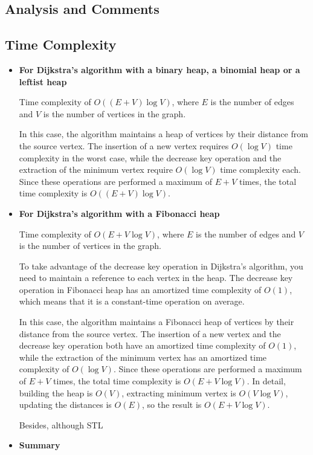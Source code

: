 \documentclass[twoside]{article}
\begin{document}
\begin{CJK*}{UTF8}{gbsn}
\section{Analysis and Comments}

\subsection{Time Complexity}
\begin{itemize}
    \item \textbf{For Dijkstra's algorithm with a binary heap, a binomial heap or a leftist heap}

    Time complexity of ${O((E + V) \log V)}$, where $E$ is the number of edges and $V$ is the number of vertices in the graph.
    
    In this case, the algorithm maintains a heap of vertices by their distance from the source vertex.  The insertion of a new vertex requires ${O(\log V)}$ time complexity in the worst case, while the decrease key operation and the extraction of the minimum vertex require ${O(\log V)}$ time complexity each.  Since these operations are performed a maximum of $E + V$ times, the total time complexity is ${O((E + V) \log V)}$.
    \item \textbf{For Dijkstra's algorithm with a Fibonacci heap}

    Time complexity of ${O(E + V \log V)}$, where $E$ is the number of edges and $V$ is the number of vertices in the graph. 

    To take advantage of the decrease key operation in Dijkstra's algorithm, you need to maintain a reference to each vertex in the heap. The decrease key operation in Fibonacci heap has an amortized time complexity of ${O(1)}$, which means that it is a constant-time operation on average.

    In this case, the algorithm maintains a Fibonacci heap of vertices by their distance from the source vertex. The insertion of a new vertex and the decrease key operation both have an amortized time complexity of ${O(1)}$, while the extraction of the minimum vertex has an amortized time complexity of ${O(\log V)}$. Since these operations are performed a maximum of $E + V$ times, the total time complexity is ${O(E + V \log V)}$. In detail, building the heap is $O(V)$, extracting minimum vertex is $O(V\log V)$, updating the distances is $O(E)$, so the result is ${O(E + V \log V)}$.

    Besides, although STL
    \item \textbf{Summary}
    

\end{itemize}
\end{CJK*}
\end{document}
